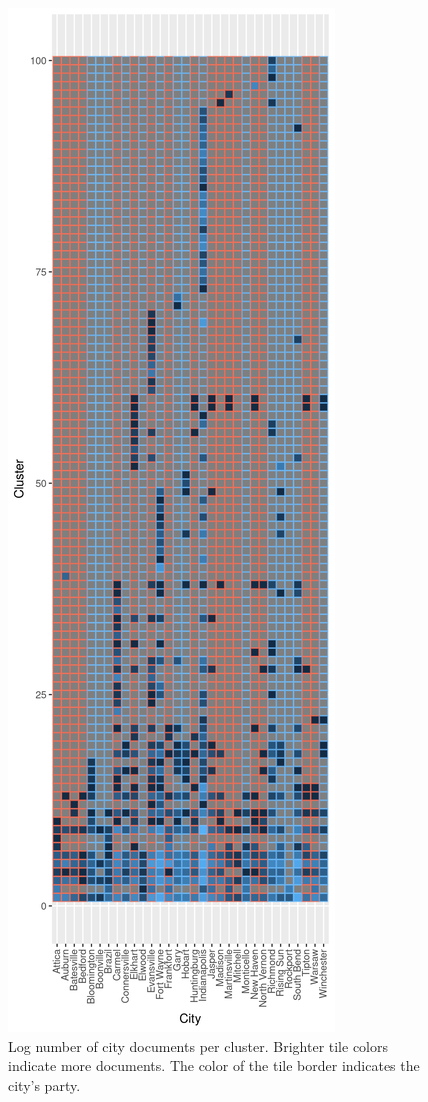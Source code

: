 \documentclass[11pt]{article}
\begin{document}
\begin{figure}[!ht]
	\centering
	\caption{Log number of city documents per cluster. Brighter tile colors indicate more documents. The color of the tile border indicates the city's party.}
	\label{hclustCity100}
	\includegraphics[height = 1.2\textheight]{figures/heatmap_hclust_100.png}
\end{figure}
\end{document}
